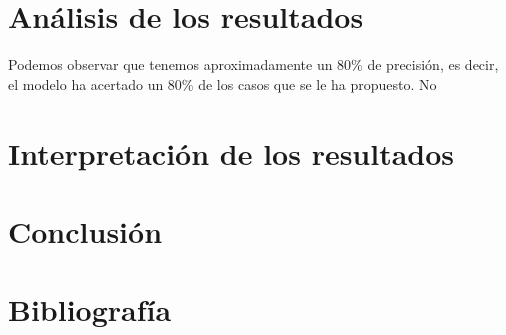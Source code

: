 \documentclass[11pt,a4paper]{article}
\begin{document}
\newpage
\section{Análisis de los resultados}
Podemos observar que tenemos aproximadamente un 80\% de precisión, es decir, el modelo ha acertado un 80\% de los casos que se le
ha propuesto. No 


\section{Interpretación de los resultados}



\section{Conclusión} %


\section{Bibliografía}
\end{document}
